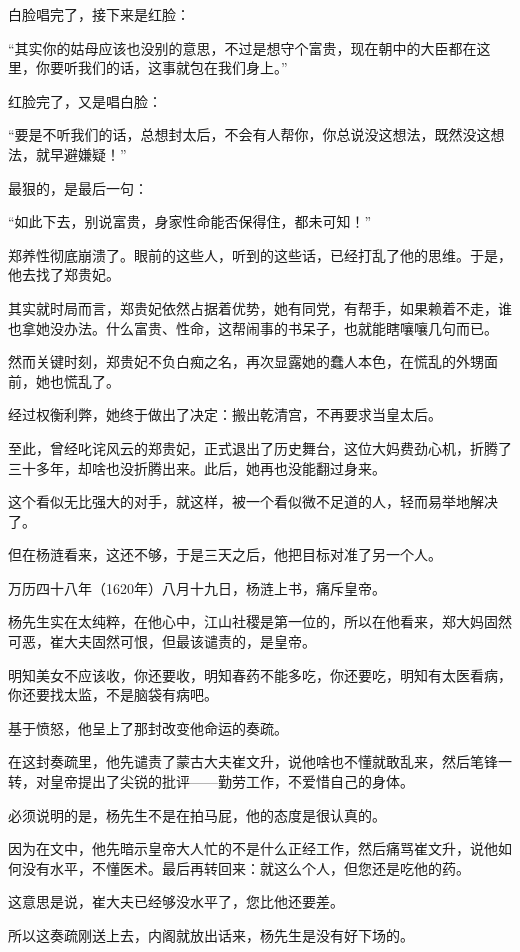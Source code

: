 \begin{multicols}{\theparacolNo}
		白脸唱完了，接下来是红脸：

		“其实你的姑母应该也没别的意思，不过是想守个富贵，现在朝中的大臣都在这里，你要听我们的话，这事就包在我们身上。”

		红脸完了，又是唱白脸：

		“要是不听我们的话，总想封太后，不会有人帮你，你总说没这想法，既然没这想法，就早避嫌疑！”

		最狠的，是最后一句：

		“如此下去，别说富贵，身家性命能否保得住，都未可知！”

		郑养性彻底崩溃了。眼前的这些人，听到的这些话，已经打乱了他的思维。于是，他去找了郑贵妃。

		其实就时局而言，郑贵妃依然占据着优势，她有同党，有帮手，如果赖着不走，谁也拿她没办法。什么富贵、性命，这帮闹事的书呆子，也就能瞎嚷嚷几句而已。

		然而关键时刻，郑贵妃不负白痴之名，再次显露她的蠢人本色，在慌乱的外甥面前，她也慌乱了。

		经过权衡利弊，她终于做出了决定：搬出乾清宫，不再要求当皇太后。

		至此，曾经叱诧风云的郑贵妃，正式退出了历史舞台，这位大妈费劲心机，折腾了三十多年，却啥也没折腾出来。此后，她再也没能翻过身来。

		这个看似无比强大的对手，就这样，被一个看似微不足道的人，轻而易举地解决了。

		但在杨涟看来，这还不够，于是三天之后，他把目标对准了另一个人。

		万历四十八年（1620年）八月十九日，杨涟上书，痛斥皇帝。

		杨先生实在太纯粹，在他心中，江山社稷是第一位的，所以在他看来，郑大妈固然可恶，崔大夫固然可恨，但最该谴责的，是皇帝。

		明知美女不应该收，你还要收，明知春药不能多吃，你还要吃，明知有太医看病，你还要找太监，不是脑袋有病吧。

		基于愤怒，他呈上了那封改变他命运的奏疏。

		在这封奏疏里，他先谴责了蒙古大夫崔文升，说他啥也不懂就敢乱来，然后笔锋一转，对皇帝提出了尖锐的批评——勤劳工作，不爱惜自己的身体。

		必须说明的是，杨先生不是在拍马屁，他的态度是很认真的。

		因为在文中，他先暗示皇帝大人忙的不是什么正经工作，然后痛骂崔文升，说他如何没有水平，不懂医术。最后再转回来：就这么个人，但您还是吃他的药。

		这意思是说，崔大夫已经够没水平了，您比他还要差。

		所以这奏疏刚送上去，内阁就放出话来，杨先生是没有好下场的。


\end{multicols}
